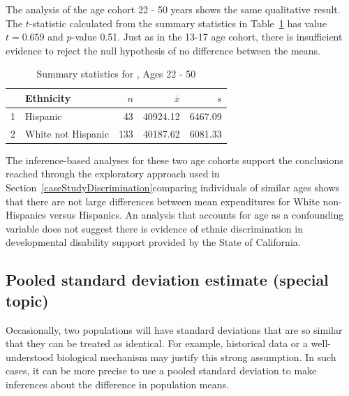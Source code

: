 The analysis of the age cohort 22 - 50 years shows the same qualitative result. The $t$-statistic calculated from the summary statistics in Table~\ref{ddsExpEthnicityAge22Table} has value $t = 0.659$ and $p$-value 0.51. Just as in the 13-17 age cohort, there is insufficient evidence to reject the null hypothesis of no difference between the means.

\begin{table}[h!]
\centering
\begin{tabular}{rlrrr}
  \hline
 & Ethnicity & $n$ & $\overline{x}$ & $s$ \\ 
  \hline
1 & Hispanic &  43 & 40924.12 & 6467.09 \\ 
  2 & White not Hispanic & 133 & 40187.62 & 6081.33 \\ 
   \hline
\end{tabular}
\caption{Summary statistics for , Ages 22 - 50} 
\label{ddsExpEthnicityAge22Table}
\end{table}

The inference-based analyses for these two age cohorts support the conclusions reached through the exploratory approach used in Section~\ref{caseStudyDiscrimination}\textemdash comparing individuals of similar ages shows that there are not large differences between mean expenditures for White non-Hispanics versus Hispanics. An analysis that accounts for age as a confounding variable does not suggest there is evidence of ethnic discrimination in developmental disability support provided by the State of California.




\subsection{Pooled standard deviation estimate (special topic)}
\label{pooledStandardDeviations}

Occasionally, two populations will have standard deviations that are so similar that they can be treated as identical. For example, historical data or a well-understood biological mechanism may justify this strong assumption. In such cases, it can be more precise to use a pooled standard deviation to make inferences about the difference in population means.

